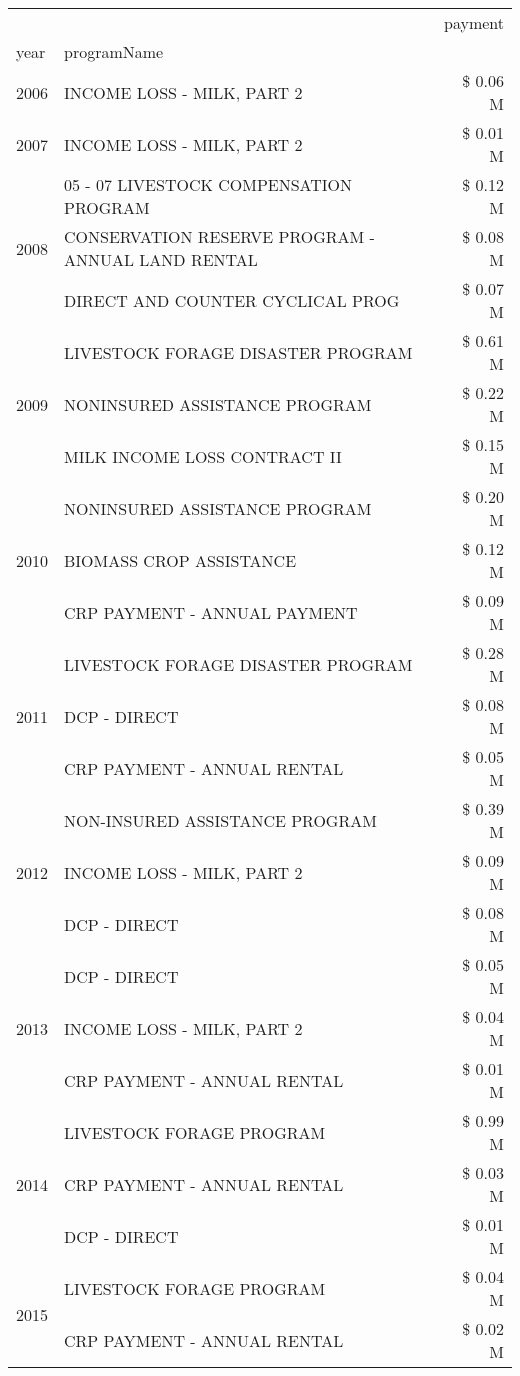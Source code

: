 \begin{tabular}{llr}
\toprule
 &  & payment \\
year & programName &  \\
\midrule
2006 & INCOME LOSS - MILK, PART 2 & \$ 0.06 M \\
\cline{1-3}
2007 & INCOME LOSS - MILK, PART 2 & \$ 0.01 M \\
\cline{1-3}
\multirow[t]{3}{*}{2008} & 05 - 07 LIVESTOCK COMPENSATION PROGRAM & \$ 0.12 M \\
 & CONSERVATION RESERVE PROGRAM - ANNUAL LAND RENTAL & \$ 0.08 M \\
 & DIRECT AND COUNTER CYCLICAL PROG & \$ 0.07 M \\
\cline{1-3}
\multirow[t]{3}{*}{2009} & LIVESTOCK FORAGE DISASTER  PROGRAM & \$ 0.61 M \\
 & NONINSURED ASSISTANCE PROGRAM & \$ 0.22 M \\
 & MILK INCOME LOSS CONTRACT II & \$ 0.15 M \\
\cline{1-3}
\multirow[t]{3}{*}{2010} & NONINSURED ASSISTANCE PROGRAM & \$ 0.20 M \\
 & BIOMASS CROP ASSISTANCE & \$ 0.12 M \\
 & CRP PAYMENT - ANNUAL PAYMENT & \$ 0.09 M \\
\cline{1-3}
\multirow[t]{3}{*}{2011} & LIVESTOCK FORAGE DISASTER PROGRAM & \$ 0.28 M \\
 & DCP - DIRECT & \$ 0.08 M \\
 & CRP PAYMENT - ANNUAL RENTAL & \$ 0.05 M \\
\cline{1-3}
\multirow[t]{3}{*}{2012} & NON-INSURED ASSISTANCE PROGRAM & \$ 0.39 M \\
 & INCOME LOSS - MILK, PART 2 & \$ 0.09 M \\
 & DCP - DIRECT & \$ 0.08 M \\
\cline{1-3}
\multirow[t]{3}{*}{2013} & DCP - DIRECT & \$ 0.05 M \\
 & INCOME LOSS - MILK, PART 2 & \$ 0.04 M \\
 & CRP PAYMENT - ANNUAL RENTAL & \$ 0.01 M \\
\cline{1-3}
\multirow[t]{3}{*}{2014} & LIVESTOCK FORAGE PROGRAM & \$ 0.99 M \\
 & CRP PAYMENT - ANNUAL RENTAL & \$ 0.03 M \\
 & DCP - DIRECT & \$ 0.01 M \\
\cline{1-3}
\multirow[t]{3}{*}{2015} & LIVESTOCK FORAGE PROGRAM & \$ 0.04 M \\
 & CRP PAYMENT - ANNUAL RENTAL & \$ 0.02 M \\

\end{tabular}

